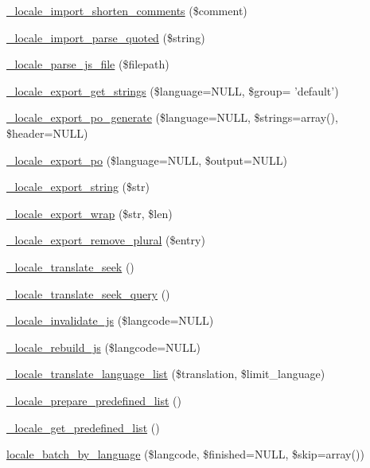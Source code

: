 \begin{CompactItemize}
\hyperlink{group__locale_g1cba05a4c159b1ed844f18ba484cc8e7}{\_\-locale\_\-import\_\-shorten\_\-comments} (\$comment)
\item 
\hyperlink{group__locale_gac1954e79c57539b5599ff4ed7379df7}{\_\-locale\_\-import\_\-parse\_\-quoted} (\$string)
\item 
\hyperlink{locale_8inc_99a08903312f70ac95f490bdd9e1e6f1}{\_\-locale\_\-parse\_\-js\_\-file} (\$filepath)
\item 
\hyperlink{group__locale_gde17be27a5240ba4804dc51eccf40246}{\_\-locale\_\-export\_\-get\_\-strings} (\$language=NULL, \$group= 'default')
\item 
\hyperlink{group__locale_g694b7e78936d2875e18ef4c8171b7eb8}{\_\-locale\_\-export\_\-po\_\-generate} (\$language=NULL, \$strings=array(), \$header=NULL)
\item 
\hyperlink{group__locale_gc152719d6aeadee6074247100424e145}{\_\-locale\_\-export\_\-po} (\$language=NULL, \$output=NULL)
\item 
\hyperlink{group__locale_g8203c2c5a4f964da2395889920934fae}{\_\-locale\_\-export\_\-string} (\$str)
\item 
\hyperlink{group__locale_gae41274b64222185a36a42dbc0ff4b94}{\_\-locale\_\-export\_\-wrap} (\$str, \$len)
\item 
\hyperlink{group__locale_ga18a14faeb8268aee1530afb6b03cca1}{\_\-locale\_\-export\_\-remove\_\-plural} (\$entry)
\item 
\hyperlink{group__locale_g006049082d29be75fd8ad396beda5883}{\_\-locale\_\-translate\_\-seek} ()
\item 
\hyperlink{group__locale_g3afc18d03a7b2355e9328bc211acc4d1}{\_\-locale\_\-translate\_\-seek\_\-query} ()
\item 
\hyperlink{group__locale_ge1eec455fe9fcd01af98bb37ff4096ae}{\_\-locale\_\-invalidate\_\-js} (\$langcode=NULL)
\item 
\hyperlink{group__locale_g1235873f9a64b606895cd77628bffabc}{\_\-locale\_\-rebuild\_\-js} (\$langcode=NULL)
\item 
\hyperlink{group__locale_gcf9e97475d1e1ffaaf336e3a943163a2}{\_\-locale\_\-translate\_\-language\_\-list} (\$translation, \$limit\_\-language)
\item 
\hyperlink{group__locale_gdf3279a1c940efe6955edc1899a97aad}{\_\-locale\_\-prepare\_\-predefined\_\-list} ()
\item 
\hyperlink{group__locale_gfac9d59fd436286a3f3738140ce96e82}{\_\-locale\_\-get\_\-predefined\_\-list} ()
\item 
\hyperlink{group__locale_g2c34cb914394a45fb4e94561bfc26b71}{locale\_\-batch\_\-by\_\-language} (\$langcode, \$finished=NULL, \$skip=array())

\end{CompactItemize}
